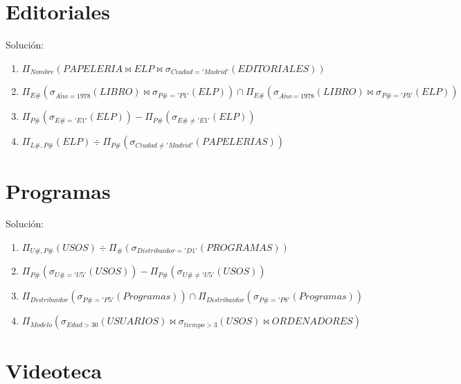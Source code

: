 \documentclass[a4paper]{article}
\begin{document}
\section{Editoriales}

Solución:

\begin{enumerate}
    \item $\Pi_{Nombre} \left( PAPELERIA \bowtie ELP \bowtie \sigma_{Ciudad='Madrid'} \left( EDITORIALES \right) \right)$
    \item $\Pi_{E\#} \left( \sigma_{A\tilde{n}o=1978} \left( LIBRO \right) \bowtie \sigma_{P\#='P1'} \left( ELP \right) \right) \cap \Pi_{E\#} \left( \sigma_{A\tilde{n}o=1978} \left( LIBRO \right) \bowtie \sigma_{P\#='P3'} \left( ELP \right) \right)$
    \item $\Pi_{P\#} \left( \sigma_{E\#='E1'} \left( ELP \right) \right) - \Pi_{P\#} \left( \sigma_{E\# \neq 'E1'} \left( ELP \right) \right)$
    \item $\Pi_{L\#,P\#} \left( ELP \right) \div \Pi_{P\#} \left( \sigma_{Ciudad \neq 'Madrid'} \left( PAPELERIAS \right) \right)$
\end{enumerate}

\section{Programas}

Solución:

\begin{enumerate}
    \item $\Pi_{U\#, P\#} \left( USOS \right) \div \Pi_{\#} \left( \sigma_{Distribuidor='D1'} \left( PROGRAMAS \right) \right)$
    \item $\Pi_{P\#} \left( \sigma_{U\#='U5'} \left( USOS \right)\right) - \Pi_{P\#} \left( \sigma_{U\#\neq'U5'} \left( USOS \right)\right)$
    \item $\Pi_{Distribuidor} \left( \sigma_{P\#='P5'} \left( Programas \right) \right) \cap \Pi_{Distribuidor} \left( \sigma_{P\#='P8'} \left( Programas \right) \right)$
    \item $\Pi_{Modelo} \left( \sigma_{Edad > 30} \left( USUARIOS \right) \bowtie \sigma_{tiempo > 3} \left( USOS \right) \bowtie ORDENADORES \right)$
\end{enumerate}

\section{Videoteca}
\end{document}
